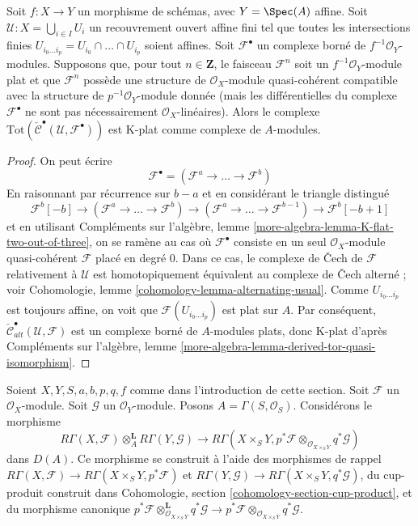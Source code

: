 \begin{lemma}
\label{lemma-K-flat}
Soit $f : X \to Y$ un morphisme de schémas, avec $Y = \Spec(A)$ affine.
Soit $\mathcal{U} : X = \bigcup_{i \in I} U_i$ un recouvrement ouvert affine fini
tel que toutes les intersections finies
$U_{i_0 \ldots i_p} = U_{i_0} \cap \ldots \cap U_{i_p}$
soient affines. Soit $\mathcal{F}^\bullet$ un complexe borné de
$f^{-1}\mathcal{O}_Y$-modules. Supposons que, pour tout $n \in \mathbf{Z}$,
le faisceau $\mathcal{F}^n$ soit un $f^{-1}\mathcal{O}_Y$-module plat et que
$\mathcal{F}^n$ possède une structure de $\mathcal{O}_X$-module quasi-cohérent
compatible avec la structure de $p^{-1}\mathcal{O}_Y$-module donnée (mais les
différentielles du complexe $\mathcal{F}^\bullet$ ne sont pas nécessairement
$\mathcal{O}_X$-linéaires). Alors le complexe
$\text{Tot}(\check{\mathcal{C}}^\bullet(\mathcal{U}, \mathcal{F}^\bullet))$
est K-plat comme complexe de $A$-modules.
\end{lemma}

\begin{proof}
On peut écrire
$$
\mathcal{F}^\bullet = (\mathcal{F}^a \to \ldots \to \mathcal{F}^b)
$$
En raisonnant par récurrence sur $b - a$ et en considérant le triangle distingué
$$
\mathcal{F}^b[-b] \to (\mathcal{F}^a \to \ldots \to \mathcal{F}^b)
\to (\mathcal{F}^a \to \ldots \to \mathcal{F}^{b - 1}) \to
\mathcal{F}^b[-b + 1]
$$
et en utilisant
Compléments sur l'algèbre, lemme \ref{more-algebra-lemma-K-flat-two-out-of-three},
on se ramène au cas où $\mathcal{F}^\bullet$ consiste en un seul
$\mathcal{O}_X$-module quasi-cohérent $\mathcal{F}$
placé en degré $0$. Dans ce cas, le complexe de {\v C}ech
de $\mathcal{F}$ relativement à $\mathcal{U}$ est homotopiquement équivalent au
complexe de {\v C}ech alterné ; voir
Cohomologie, lemme \ref{cohomology-lemma-alternating-usual}.
Comme $U_{i_0 \ldots i_p}$ est toujours affine, on voit que
$\mathcal{F}(U_{i_0 \ldots i_p})$ est plat sur $A$.
Par conséquent,
$\check{\mathcal{C}}_{alt}^\bullet(\mathcal{U}, \mathcal{F})$
est un complexe borné de $A$-modules plats, donc K-plat
d'après Compléments sur l'algèbre, lemme
\ref{more-algebra-lemma-derived-tor-quasi-isomorphism}.
\end{proof}

\noindent
Soient $X, Y, S, a, b, p, q, f$ comme dans l'introduction de cette section.
Soit $\mathcal{F}$ un $\mathcal{O}_X$-module.
Soit $\mathcal{G}$ un $\mathcal{O}_Y$-module.
Posons $A = \Gamma(S, \mathcal{O}_S)$.
Considérons le morphisme
\begin{equation}
\label{equation-kunneth-single-sheaves}
R\Gamma(X, \mathcal{F})
\otimes_A^\mathbf{L}
R\Gamma(Y, \mathcal{G})
\longrightarrow
R\Gamma(X \times_S Y,
p^*\mathcal{F}
\otimes_{\mathcal{O}_{X \times_S Y}}
q^*\mathcal{G})
\end{equation}
dans $D(A)$. Ce morphisme se construit à l'aide des morphismes de rappel
$R\Gamma(X, \mathcal{F}) \to R\Gamma(X \times_S Y, p^*\mathcal{F})$ et
$R\Gamma(Y, \mathcal{G}) \to R\Gamma(X \times_S Y, q^*\mathcal{G})$,
du cup-produit construit dans
Cohomologie, section \ref{cohomology-section-cup-product}, et
du morphisme canonique
$p^*\mathcal{F}
\otimes_{\mathcal{O}_{X \times_S Y}}^\mathbf{L}
q^*\mathcal{G}
\to
p^*\mathcal{F}
\otimes_{\mathcal{O}_{X \times_S Y}}
q^*\mathcal{G}$.

